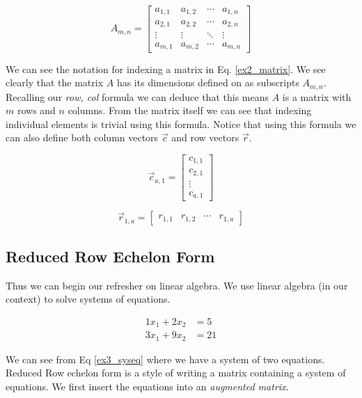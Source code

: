 \documentclass[12pt]{article}
\begin{document}
					\begin{equation} \label{ex2_matrix}
						A_{m,n} = 
						 \begin{bmatrix}
							a_{1,1} & a_{1,2} & \cdots & a_{1,n} \\
							a_{2,1} & a_{2,2} & \cdots & a_{2,n} \\
							\vdots  & \vdots  & \ddots & \vdots  \\
							a_{m,1} & a_{m,2} & \cdots & a_{m,n} 
						 \end{bmatrix}
				 \end{equation}

				 We can see the notation for indexing a matrix in Eq. \eqref{ex2_matrix}.
				 We see clearly that the matrix $A$ has its dimensions defined on as subscripts $A_{m,n}$.
				 Recalling our \textit{row, col} formula we can deduce that this means $A$ is a matrix with $m$ rows and $n$ columns.
				 From the matrix itself we can see that indexing individual elements is trivial using this formula.
				 Notice that using this formula we can also define both column vectors $\vec{c}$ and row vectors $\vec{r}$.

				 \[
					 \vec{c}_{a,1} =
					 \begin{bmatrix}
						 c_{1,1} \\
						 c_{2,1} \\
						 \vdots \\
						 c_{a,1}
					 \end{bmatrix}
				 \]

				 \[
					 \vec{r}_{1,a} =
					 \begin{bmatrix}
						 r_{1,1} & r_{1,2} & \cdots & r_{1,a}
					 \end{bmatrix}
				 \]


				\subsection{Reduced Row Echelon Form}
					Thus we can begin our refresher on linear algebra.
					We use linear algebra (in our context) to solve systems of equations.
					
					\begin{equation} \label{ex3_syseq}
						\begin{split}
							1x_1 + 2x_2 &= 5 \\
							3x_1 + 9x_2 &= 21
						\end{split}
					\end{equation}

					We can see from Eq \eqref{ex3_syseq} where we have a system of two equations.
					Reduced Row echelon form is a style of writing a matrix containing a system of equations.
					We first insert the equations into an \textit{augmented matrix}.
\end{document}
